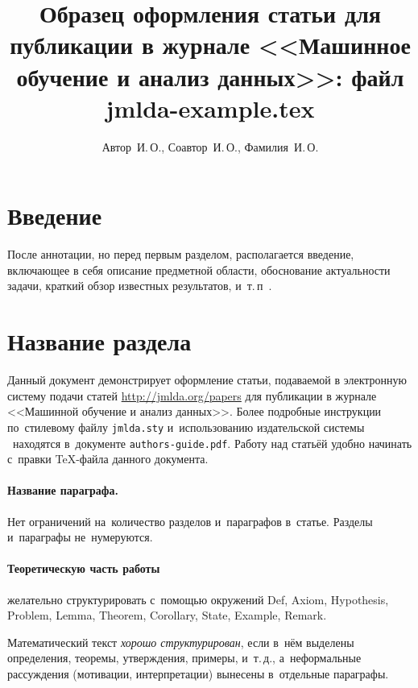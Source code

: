 \documentclass[12pt,twoside]{article}
\title
    [Образец оформления статьи для публикации] %
    {Образец оформления статьи для публикации в журнале <<Машинное обучение и анализ данных>>: файл jmlda-example.tex}
\author
    [Автор~И.\,О.] %
    {Автор~И.\,О., Соавтор~И.\,О., Фамилия~И.\,О.} %
    [Автор~И.\,О.$^1$, Соавтор~И.\,О.$^2$, Фамилия~И.\,О.$^2$] %
\begin{document}
\maketitle
\section{Введение}
После аннотации, но перед первым разделом,
располагается введение, включающее в себя
описание предметной области,
обоснование актуальности задачи,
краткий обзор известных результатов,
и~т.\,п~\cite{author09anyscience,myHandbook,author09first-word-of-the-title,voron06latex,author-and-co2007,Lvovsky03}.

\section{Название раздела}
Данный документ демонстрирует оформление статьи,
подаваемой в электронную систему подачи статей \url{http://jmlda.org/papers} для публикации в журнале <<Машинной обучение и анализ данных>>.
Более подробные инструкции по~стилевому файлу \texttt{jmlda.sty}
и~использованию издательской системы \LaTeXe\
находятся в~документе \texttt{authors-guide.pdf}.
Работу над статьёй удобно начинать с~правки \TeX-файла данного документа.

\paragraph{Название параграфа.}
Нет ограничений на~количество разделов и~параграфов в~статье.
Разделы и~параграфы не~нумеруются.

\paragraph{Теоретическую часть работы} желательно структурировать
с~помощью окружений
Def, Axiom, Hypothesis, Problem, Lemma, Theorem, Corollary, State, Example, Remark.

\begin{Def}
    Математический текст \emph{хорошо структурирован},
    если в~нём выделены определения, теоремы, утверждения, примеры, и~т.\,д.,
    а~неформальные рассуждения (мотивации, интерпретации)
    вынесены в~отдельные параграфы.
\end{Def}
\end{document}
